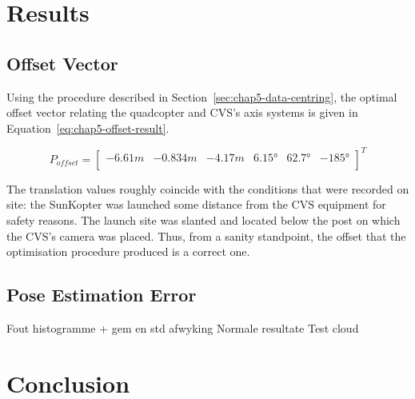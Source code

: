 \section{Results}

\subsection{Offset Vector}

Using the procedure described in Section~\ref{sec:chap5-data-centring}, the optimal offset vector relating the quadcopter and CVS's axis systems is given in Equation~\ref{eq:chap5-offset-result}. 

\begin{equation}
  \label{eq:chap5-offset-result}
  P_{offset} = 
  \begin{bmatrix}
    -6.61m & -0.834m & -4.17m & \ang{6.15} & \ang{62.7} & \ang{-185} \\
  \end{bmatrix}^T
\end{equation}

The translation values roughly coincide with the conditions that were recorded on site: the SunKopter was launched some distance from the CVS equipment for safety reasons. The launch site was slanted and located below the post on which the CVS's camera was placed. Thus, from a sanity standpoint, the offset that the optimisation procedure produced is a correct one. 

\subsection{Pose Estimation Error}

Fout histogramme + gem en std afwyking
Normale resultate
Test cloud



\section{Conclusion}



